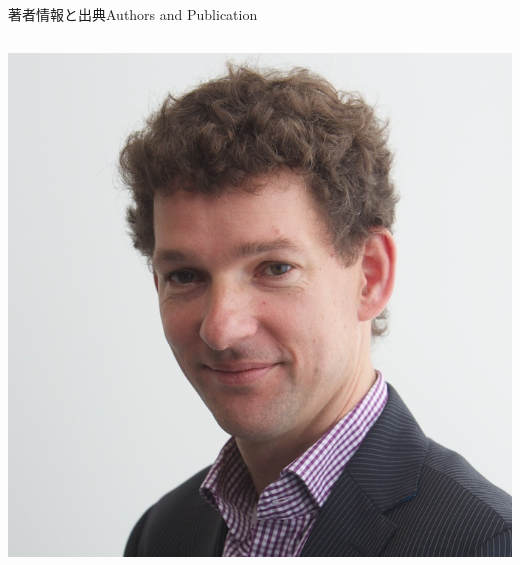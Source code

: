 \begin{frame}{著者情報と出典}{Authors and Publication}
\begin{columns}
\begin{column}{0.2\textwidth}
\includegraphics[width=\textwidth]{Deursen}
\end{column}
\end{columns}
\end{frame}

